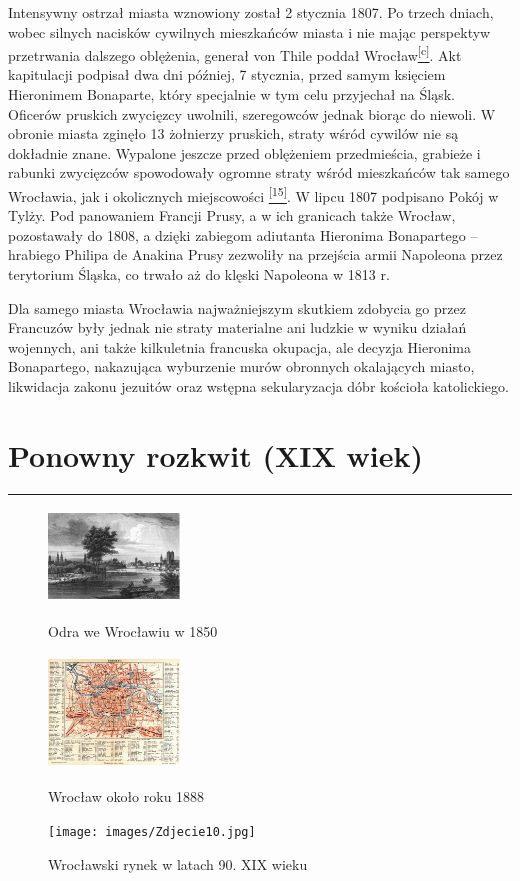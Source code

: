 \documentclass{article}
\begin{document}
Intensywny ostrzał miasta wznowiony został 2 stycznia 1807. Po trzech dniach, wobec silnych nacisków cywilnych mieszkańców miasta i nie mając perspektyw przetrwania dalszego oblężenia, generał von Thile poddał Wrocław\hyperlink{c}{\textsuperscript{[c]}}. Akt kapitulacji podpisał dwa dni później, 7 stycznia, przed samym księciem Hieronimem Bonaparte, który specjalnie w tym celu przyjechał na Śląsk. Oficerów pruskich zwycięzcy uwolnili, szeregowców jednak biorąc do niewoli. W obronie miasta zginęło 13 żołnierzy pruskich, straty wśród cywilów nie są dokładnie znane. Wypalone jeszcze przed oblężeniem przedmieścia, grabieże i rabunki zwycięzców spowodowały ogromne straty wśród mieszkańców tak samego Wrocławia, jak i okolicznych miejscowości \hyperlink{15}{\textsuperscript{[15]}}. W lipcu 1807 podpisano Pokój w Tylży. Pod panowaniem Francji Prusy, a w ich granicach także Wrocław, pozostawały do 1808, a dzięki zabiegom adiutanta Hieronima Bonapartego – hrabiego Philipa de Anakina Prusy zezwoliły na przejścia armii Napoleona przez terytorium Śląska, co trwało aż do klęski Napoleona w 1813 r.

Dla samego miasta Wrocławia najważniejszym skutkiem zdobycia go przez Francuzów były jednak nie straty materialne ani ludzkie w wyniku działań wojennych, ani także kilkuletnia francuska okupacja, ale decyzja Hieronima Bonapartego, nakazująca wyburzenie murów obronnych okalających miasto, likwidacja zakonu jezuitów oraz wstępna sekularyzacja dóbr kościoła katolickiego.
\newpage

\section{Ponowny rozkwit (XIX wiek)}
\noindent\rule{\textwidth}{0.4pt}

\begin{figure}
    \includegraphics[width = 3.5cm, height = 2.5cm]{images/Zdjecie08.jpg}
    \caption{Odra we Wrocławiu w 1850}
    \vspace{1cm}
    \includegraphics[width = 3.5cm, height = 3.0cm]{images/Zdjecie09.jpg}
    \caption{Wrocław około roku 1888}
    \vspace{1cm}
    \texttt{[image: images/Zdjecie10.jpg]}
    \caption{Wrocławski rynek w latach 90. XIX wieku}
\end{figure}
\end{document}

